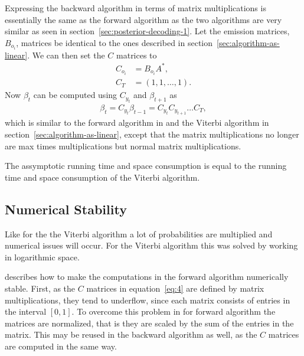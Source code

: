 Expressing the backward algorithm in terms of matrix multiplications is
essentially the same as the forward algorithm as the two algorithms are very
similar as seen in section~\ref{sec:posterior-decoding-1}. Let the emission
matrices, $B_{o_i}$, matrices be identical to the ones described in
section~\ref{sec:algorithm-as-linear}. We can then set the $C$ matrices to
\begin{equation}
  \label{eq:4}
  \begin{aligned}
    C_{o_i} & = B_{o_i} A^*, \\
    C_T & = (1, 1, \dots, 1).
  \end{aligned}
\end{equation}
Now $\beta_t$ can be computed using $C_{y_t}$ and $\beta_{t + 1}$ as
\begin{equation}
  \label{eq:5}
  \begin{aligned}
    \beta_t = C_{y_t} \beta_{t - 1} = C_{y_t} C_{y_{t+1}}\dots C_T,
  \end{aligned}
\end{equation}
which is similar to the forward algorithm in \citet{sand2013ziphmmlib} and the
Viterbi algorithm in section~\ref{sec:algorithm-as-linear}, except that the
matrix multiplications no longer are max times multiplications but normal
matrix multiplications.

The assymptotic running time and space consumption is equal to the running time
and space consumption of the Viterbi algorithm.


\subsection{Numerical Stability}

Like for the the Viterbi algorithm a lot of probabilities are multiplied and
numerical issues will occur. For the Viterbi algorithm this was solved by
working in logarithmic space.

\citet{sand2013ziphmmlib} describes how to make the computations in the forward
algorithm numerically stable. First, as the $C$ matrices in
equation~\eqref{eq:4} are defined by matrix multiplications, they tend to
underflow, since each matrix consists of entries in the interval $[0, 1]$. To
overcome this problem in for forward algorithm the matrices are normalized,
that is they are scaled by the sum of the entries in the matrix. This may be
reused in the backward algorithm as well, as the $C$ matrices are computed in
the same way.


